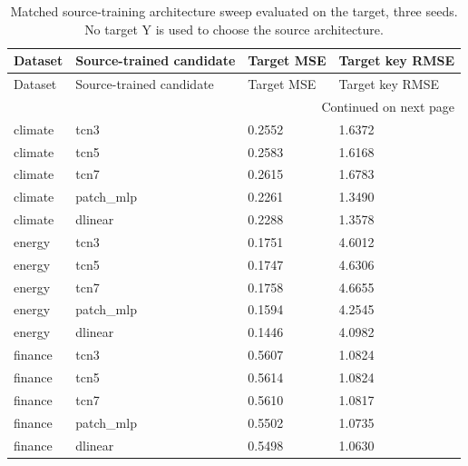 {\footnotesize
\setlength{\tabcolsep}{3pt}
\renewcommand{\arraystretch}{1.17}
\begin{longtable}{@{}p{}p{}p{}p{}@{}}
\caption{Matched source-training architecture sweep evaluated on the target, three seeds. No target Y is used to choose the source architecture.}\label{tab:depth_table}\\
\toprule
Dataset & Source-trained candidate & Target MSE & Target key RMSE \\
\midrule\endfirsthead
Dataset & Source-trained candidate & Target MSE & Target key RMSE \\
\midrule\endhead
\midrule\multicolumn{4}{r}{Continued on next page}\\\endfoot
\bottomrule\endlastfoot
climate & tcn3 & 0.2552 & 1.6372 \\
climate & tcn5 & 0.2583 & 1.6168 \\
climate & tcn7 & 0.2615 & 1.6783 \\
climate & patch\_\allowbreak{}mlp & 0.2261 & 1.3490 \\
climate & dlinear & 0.2288 & 1.3578 \\
energy & tcn3 & 0.1751 & 4.6012 \\
energy & tcn5 & 0.1747 & 4.6306 \\
energy & tcn7 & 0.1758 & 4.6655 \\
energy & patch\_\allowbreak{}mlp & 0.1594 & 4.2545 \\
energy & dlinear & 0.1446 & 4.0982 \\
finance & tcn3 & 0.5607 & 1.0824 \\
finance & tcn5 & 0.5614 & 1.0824 \\
finance & tcn7 & 0.5610 & 1.0817 \\
finance & patch\_\allowbreak{}mlp & 0.5502 & 1.0735 \\
finance & dlinear & 0.5498 & 1.0630 \\
\end{longtable}
}
